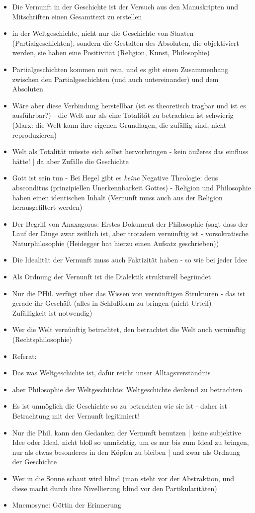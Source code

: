 \documentclass[emulatestandardclasses]{scrartcl}
\begin{document}
\begin{itemize}
  \item Die Vernunft in der Geschichte ist der Versuch aus den Manuskripten und Mitschriften einen Gesamttext zu erstellen
  \item in der Weltgeschichte, nicht nur die Geschichte von Staaten (Partialgeschichten), sondern die Gestalten des Absoluten, die objektiviert werden, sie haben eine Positivität (Religion, Kunst, Philosophie)
  \item Partialgeschichten kommen mit rein, und es gibt einen Zusammenhang zwischen den Partialgeschichten (und auch untereinander) und dem Absoluten
  \item Wäre aber diese Verbindung herstellbar (ist es theoretisch tragbar und ist es ausführbar?) - die Welt nur als eine Totalität zu betrachten ist schwierig (Marx: die Welt kann ihre eigenen Grundlagen, die zufällig sind, nicht reproduzieren)
  \item Welt als Totalität müsste sich selbst hervorbringen - kein äußeres das einfluss hätte! | da aber Zufälle die Geschichte 
  \item Gott ist sein tun - Bei Hegel gibt es \emph{keine} Negative Theologie: deus absconditus (prinzipiellen Unerkennbarkeit Gottes) - Religion und Philosophie haben einen identischen Inhalt (Vernunft muss auch aus der Religion herausgefiltert werden)
  \item Der Begriff von Anaxagoras: Erstes Dokument der Philosophie (sagt dass der Lauf der Dinge zwar zeitlich ist, aber trotzdem vernünftig ist - vorsokratische Naturphilosophie (Heidegger hat hierzu einen Aufsatz geschrieben))
  \item Die Idealität der Vernunft muss auch Faktizität haben - so wie bei jeder Idee
  \item Als Ordnung der Vernunft ist die Dialektik strukturell begründet
  \item Nur die PHil. verfügt über das Wissen von vernünftigen Strukturen - das ist gerade ihr Geschäft (alles in Schlußform zu bringen (nicht Urteil) - Zufälligkeit ist notwendig)
  \item Wer die Welt vernünftig betrachtet, den betrachtet die Welt auch vernünftig (Rechtsphilosophie)
  \item Referat:
  \item Das was Weltgeschichte ist, dafür reicht unser Alltagsverständnis
  \item aber Philosophie der Weltgeschichte: Weltgeschichte denkend zu betrachten
  \item Es ist unmöglich die Geschichte so zu betrachten wie sie ist - daher ist Betrachtung mit der Vernunft legitimiert!
  \item Nur die Phil. kann den Gedanken der Vernunft benutzen | keine subjektive Idee oder Ideal, nicht bloß so unmächtig, um es nur bis zum Ideal zu bringen, nur als etwas besonderes in den Köpfen zu bleiben | und zwar als Ordnung der Geschichte
  \item Wer in die Sonne schaut wird blind (man steht vor der Abstraktion, und diese macht durch ihre Nivellierung blind vor den Partikularitäten)
  \item Mnemosyne: Göttin der Erinnerung
\end{itemize}
\end{document}
